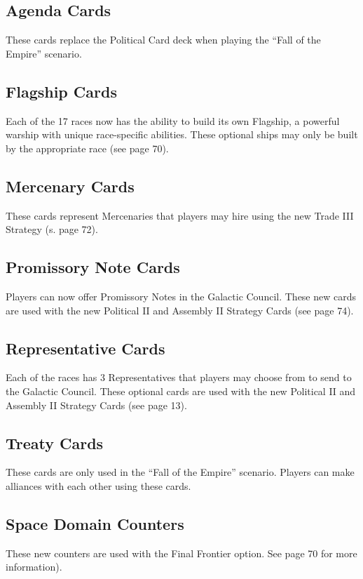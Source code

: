 \documentclass[11pt,fleqn]{book} %
\begin{document}
\begin{STbox}
\subsection{Agenda Cards}
These cards replace the Political Card deck when playing the “Fall of the Empire” scenario.

\subsection{Flagship Cards}
Each of the 17 races now has the ability to build its own Flagship, a powerful warship with unique race-specific abilities. These optional ships may only be built by the appropriate race (see page 70).

\subsection{Mercenary Cards}
These cards represent Mercenaries that players may hire using the new Trade III Strategy (s. page 72).

\subsection{Promissory Note Cards}
Players can now offer Promissory Notes in the Galactic Council. These new cards are used with the new Political II and Assembly II Strategy Cards (see page 74).

\subsection{Representative Cards}
Each of  the races has 3 Representatives that players may choose from to send to the Galactic Council. These optional cards are used with the new Political II and Assembly II Strategy Cards (see page 13).

\subsection{Treaty Cards}
These cards are only used in the “Fall of the Empire” scenario. Players can make alliances with each other using these cards.

\subsection{Space Domain Counters}
These new counters are used with the Final Frontier option. See page 70 for more information).


\end{STbox}
\end{document}
